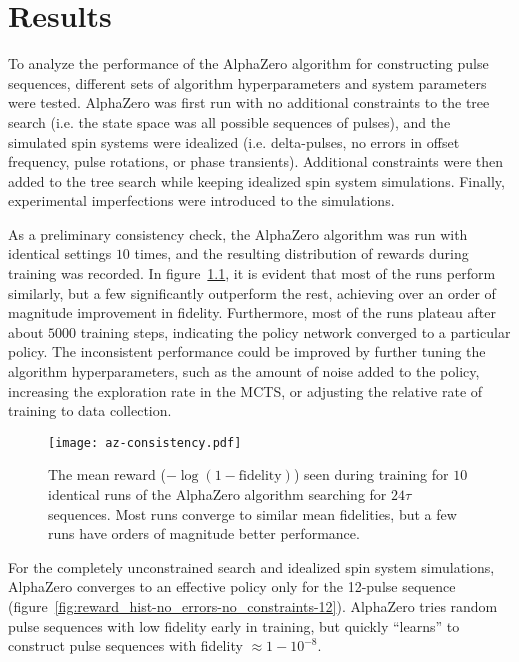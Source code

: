 \chapter{Results}

To analyze the performance of the AlphaZero algorithm for constructing pulse sequences, different sets of algorithm hyperparameters and system parameters were tested. AlphaZero was first run with no additional constraints to the tree search (i.e. the state space was all possible sequences of pulses), and the simulated spin systems were idealized (i.e. delta-pulses, no errors in offset frequency, pulse rotations, or phase transients). Additional constraints were then added to the tree search while keeping idealized spin system simulations. Finally, experimental imperfections were introduced to the simulations.



As a preliminary consistency check, the AlphaZero algorithm was run with identical settings $10$ times, and the resulting distribution of rewards during training was recorded. In figure~\ref{fig:az-consistency}, it is evident that most of the runs perform similarly, but a few significantly outperform the rest, achieving over an order of magnitude improvement in fidelity. Furthermore, most of the runs plateau after about $5000$ training steps, indicating the policy network converged to a particular policy. The inconsistent performance could be improved by further tuning the algorithm hyperparameters, such as the amount of noise added to the policy, increasing the exploration rate in the MCTS, or adjusting the relative rate of training to data collection.

\begin{figure}
    \centering
    \texttt{[image: az-consistency.pdf]}
    \caption{The mean reward ($-\log(1-\text{fidelity})$) seen during training for $10$ identical runs of the AlphaZero algorithm searching for $24\tau$ sequences. Most runs converge to similar mean fidelities, but a few runs have orders of magnitude better performance.}
    \label{fig:az-consistency}
\end{figure}


For the completely unconstrained search and idealized spin system simulations, AlphaZero converges to an effective
policy only for the 12-pulse sequence (figure~\ref{fig:reward_hist-no_errors-no_constraints-12}). AlphaZero tries random pulse sequences with low fidelity early in training, but quickly ``learns'' to construct pulse sequences with fidelity $\approx 1 - 10^{-8}$.

